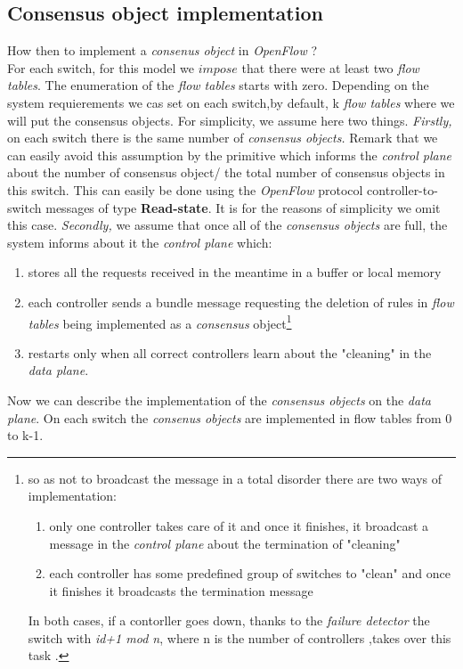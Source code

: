 \documentclass{article}
\begin{document}
\subsection{Consensus object implementation}
How then to implement a \emph{consenus object} in \emph{OpenFlow} ? \\
For each switch, for this model we $impose$ that there were at least two \emph{flow tables}. The enumeration of the \emph{flow tables} starts with zero. Depending on the system requierements we cas set on each switch,by default, k \emph{flow tables} where we will put the consensus objects. For simplicity, we assume here two things. \emph{Firstly,} on each switch there is the same number of \emph{consensus objects.} Remark that we can easily avoid this assumption by the primitive which informs the \emph{control plane} about the number of consensus object/ the total number of consensus objects in this switch. This can easily be done using the \emph{OpenFlow} protocol controller-to-switch messages of type \textbf{Read-state}. It is for the reasons of simplicity we omit this case. \emph{Secondly,} we assume that once all of the \emph{consensus objects} are full, the system informs about it the \emph{control plane} which:
\begin{enumerate}
\item stores all the requests received in the meantime in a buffer or local memory
\item each controller sends a bundle message requesting the deletion of rules in \emph{flow tables} being implemented as a \emph{consensus} object\footnote{so as not to broadcast the message in a total disorder there are two ways of implementation:
\begin{enumerate}
\item only one controller takes care of it and once it finishes, it broadcast a message in the \emph{control plane} about the termination of "cleaning"
\item each controller has some predefined group of switches to "clean" and once it finishes it broadcasts the termination message
\end{enumerate}
In both cases, if a contorller goes down, thanks to the \emph{failure detector} the switch with \emph{id+1 mod n}, where n is the number of controllers ,takes over this task . 
}
\item restarts only when all correct controllers learn about the "cleaning" in the \emph{data plane}. 
\end{enumerate}
Now we can describe the implementation of the \emph{consensus objects} on the \emph{data plane}. On each switch the \emph{consenus objects} are implemented in flow tables from 0 to k-1.
\end{document}
